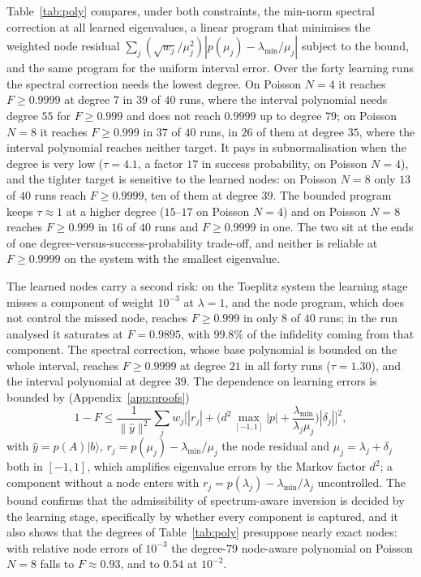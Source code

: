 \documentclass[journal]{IEEEtran}
\newcommand{\lmin}{\lambda_{\min}}
\begin{document}
Table~\ref{tab:poly} compares, under both constraints, the min-norm spectral correction at all learned eigenvalues, a linear program that minimises the weighted node residual $\sum_j(\sqrt{w_j}/\mu_j^2)|p(\mu_j)-\lmin/\mu_j|$ subject to the bound, and the same program for the uniform interval error. Over the forty learning runs the spectral correction needs the lowest degree. On Poisson $N=4$ it reaches $F\ge0.9999$ at degree $7$ in $39$ of $40$ runs, where the interval polynomial needs degree $55$ for $F\ge0.999$ and does not reach $0.9999$ up to degree $79$; on Poisson $N=8$ it reaches $F\ge0.999$ in $37$ of $40$ runs, in $26$ of them at degree $35$, where the interval polynomial reaches neither target. It pays in subnormalisation when the degree is very low ($\tau=4.1$, a factor $17$ in success probability, on Poisson $N=4$), and the tighter target is sensitive to the learned nodes: on Poisson $N=8$ only $13$ of $40$ runs reach $F\ge0.9999$, ten of them at degree $39$. The bounded program keeps $\tau\approx1$ at a higher degree ($15$--$17$ on Poisson $N=4$) and on Poisson $N=8$ reaches $F\ge0.999$ in $16$ of $40$ runs and $F\ge0.9999$ in one. The two sit at the ends of one degree-versus-success-probability trade-off, and neither is reliable at $F\ge0.9999$ on the system with the smallest eigenvalue.

The learned nodes carry a second risk: on the Toeplitz system the learning stage misses a component of weight $10^{-3}$ at $\lambda=1$, and the node program, which does not control the missed node, reaches $F\ge0.999$ in only $8$ of $40$ runs; in the run analysed it saturates at $F=0.9895$, with $99.8\%$ of the infidelity coming from that component. The spectral correction, whose base polynomial is bounded on the whole interval, reaches $F\ge0.9999$ at degree $21$ in all forty runs ($\tau=1.30$), and the interval polynomial at degree $39$. The dependence on learning errors is bounded by (Appendix~\ref{app:proofs})
\begin{equation}
1-F\le\frac{1}{\|\hat y\|^2}\sum_jw_j\Big[|r_j|+\Big(d^2\max_{[-1,1]}|p|+\frac{\lmin}{\lambda_j\mu_j}\Big)|\delta_j|\Big]^2,
\label{eq:prop10}
\end{equation}
with $\hat y=p(A)|b\rangle$, $r_j=p(\mu_j)-\lmin/\mu_j$ the node residual and $\mu_j=\lambda_j+\delta_j$ both in $[-1,1]$, which amplifies eigenvalue errors by the Markov factor $d^2$; a component without a node enters with $r_j=p(\lambda_j)-\lmin/\lambda_j$ uncontrolled. The bound confirms that the admissibility of spectrum-aware inversion is decided by the learning stage, specifically by whether every component is captured, and it also shows that the degrees of Table~\ref{tab:poly} presuppose nearly exact nodes: with relative node errors of $10^{-3}$ the degree-$79$ node-aware polynomial on Poisson $N=8$ falls to $F\approx0.93$, and to $0.54$ at $10^{-2}$.
\end{document}
